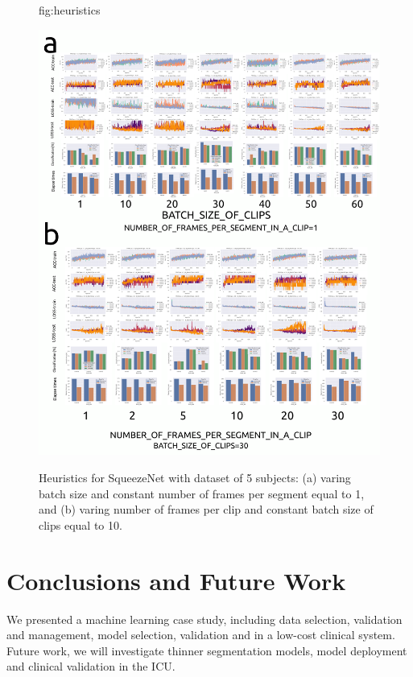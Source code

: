 \documentclass[mlabstract,twocolumn]{jmlr}
\begin{document}
\begin{figure}[htbp]
\floatconts
  {fig:heuristics}
  {
      \caption{
          Heuristics for SqueezeNet \citep{iandola2017squeezenet} with dataset of 5 subjects:
          (a) varing batch size and constant number of frames per segment equal to 1, and
          (b) varing number of frames per clip and constant batch size of clips equal to 10.
      }
  }
  {\includegraphics[width=\columnwidth]{../figures/heuristics_results/versions/drawing-v00}}%
\end{figure}

\section{Conclusions and Future Work}
We presented a machine learning case study, including data selection, validation and management, model selection, validation and in a low-cost clinical system.
Future work, we will investigate thinner segmentation models, model deployment and clinical validation in the ICU.
\end{document}
